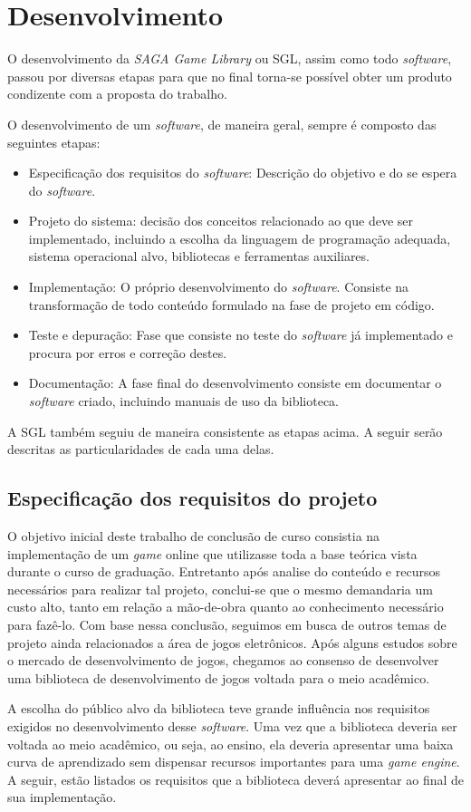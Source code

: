 \chapter{Desenvolvimento}
\label{cap:desenvolvimento}
%
%
O desenvolvimento da \textit{SAGA Game Library} ou SGL, assim como todo \textit{software}, passou por diversas etapas para que no final torna-se possível obter um produto condizente com a proposta do trabalho.
\par 
O desenvolvimento de um \textit{software}, de maneira geral, sempre é composto das seguintes etapas:
%
\begin{itemize}
 \item Especificação dos requisitos do \textit{software}: Descrição do objetivo e do se espera do \textit{software}.
 \item Projeto do sistema: decisão dos conceitos relacionado ao que deve ser implementado, incluindo a escolha da linguagem de programação
 adequada, sistema operacional alvo, bibliotecas e ferramentas auxiliares.
 \item Implementação: O próprio desenvolvimento do \textit{software}. Consiste na transformação de todo conteúdo formulado na fase de projeto em código.
 \item Teste e depuração: Fase que consiste no teste do \textit{software} já implementado e procura por erros e correção destes.
 \item Documentação: A fase final do desenvolvimento consiste em documentar o \textit{software} criado, incluindo manuais de uso da biblioteca.
\end{itemize}
%
\par 
A SGL também seguiu de maneira consistente as etapas acima. A seguir serão descritas as particularidades de cada uma delas.
%
%
\section{Especificação dos requisitos do projeto}
%
O objetivo inicial deste trabalho de conclusão de curso consistia na implementação de um \textit{game} online que utilizasse toda a base teórica vista durante o curso de graduação. Entretanto após analise do conteúdo e recursos necessários para realizar tal projeto, conclui-se que o mesmo demandaria um custo alto, tanto em relação a mão-de-obra quanto ao conhecimento necessário para fazê-lo. Com base nessa conclusão, seguimos em busca de outros temas de projeto ainda relacionados a área de jogos eletrônicos. Após alguns estudos sobre o mercado de desenvolvimento de jogos, chegamos ao consenso de desenvolver uma biblioteca de desenvolvimento de jogos voltada para o meio acadêmico.
\par 
A escolha do público alvo da biblioteca teve grande influência nos requisitos exigidos no desenvolvimento desse \textit{software}. Uma vez que
a biblioteca deveria ser voltada ao meio acadêmico, ou seja, ao ensino, ela deveria apresentar uma baixa curva de aprendizado sem dispensar recursos importantes para uma \textit{game engine}. A seguir, estão listados os requisitos que a biblioteca deverá apresentar ao final de sua implementação.
%
